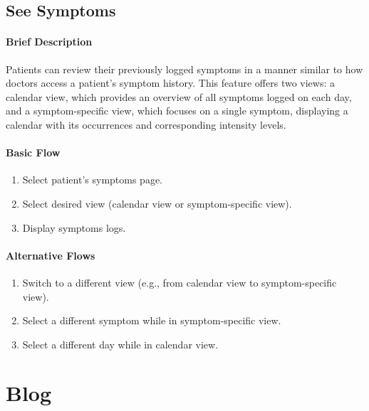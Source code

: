 \documentclass{report}
\begin{document}
\subsection{See Symptoms}
\paragraph{Brief Description}
Patients can review their previously logged symptoms in a manner similar to how doctors access a patient’s symptom history. 
This feature offers two views: a calendar view, which provides an overview of all symptoms logged on each day, and a symptom-specific view, which focuses on a single symptom, displaying a calendar with its occurrences and corresponding intensity levels.

\begin{multicols}{2}
    \paragraph{Basic Flow}
    \begin{enumerate}
        \item Select patient's symptoms page.
        \item Select desired view (calendar view or symptom-specific view).
        \item Display symptoms logs.
    \end{enumerate}
    \columnbreak

    \paragraph{Alternative Flows}
    \begin{enumerate}[label=A\arabic*.]
        \item Switch to a different view (e.g., from calendar view to symptom-specific view).
        \item Select a different symptom while in symptom-specific view.
        \item Select a different day while in calendar view.
\end{enumerate}
\end{multicols}


\vspace{1em}
\section{Blog}
\end{document}
